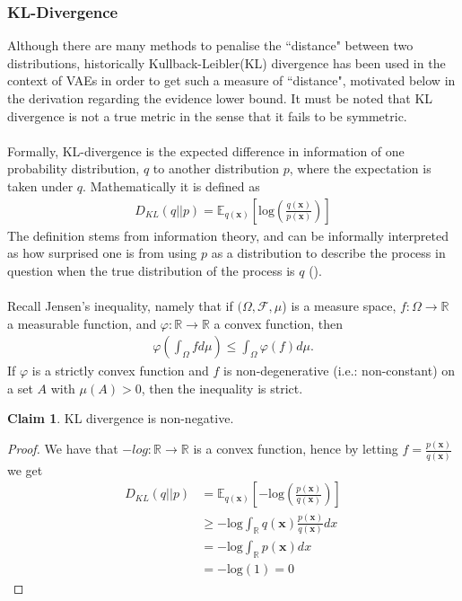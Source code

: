 \documentclass{article}
\theoremstyle{definition}
\newtheorem{claim}{Claim}
\begin{document}
\subsubsection{KL-Divergence}
Although there are many methods to penalise the ``distance" between two distributions, historically Kullback-Leibler(KL) divergence has been used in the context of VAEs in order to get such a measure of ``distance", motivated below in the derivation regarding the evidence lower bound. It must be noted that KL divergence is not a true metric in the sense that it fails to be symmetric.\\\\
Formally, KL-divergence is the expected difference in information of one probability distribution, $q$ to another distribution $p$, where the expectation is taken under $q$. Mathematically it is defined as
\begin{align}
D_{KL}(q||p) =\mathbb{E}_{q(\mathbf{x})}\left[\text{log}\left(\frac{q(\mathbf{x})}{p(\mathbf{x})}\right)\right]
\end{align}
The definition stems from information theory, and can be informally interpreted as how surprised one is from using $p$ as a distribution to describe the process in question when the true distribution of the process is $q$ (\cite{KLWikipedia2024}).
\\\\
Recall Jensen's inequality, namely that if $(\Omega, \mathcal{F}, \mu$) is a measure space, $f:\Omega \rightarrow \mathbb{R}$ a measurable function, and $\varphi: \mathbb{R} \rightarrow \mathbb{R}$ a convex function, then
\begin{align}
\varphi \left ( \int_{\Omega} f d\mu\right) \leq \int_{\Omega} \varphi (f) d\mu.
\end{align}
If $\varphi$ is a strictly convex function and $f$ is non-degenerative (i.e.: non-constant) on a set $A$ with $\mu(A)>0$, then the inequality is strict.

\begin{claim}{}
KL divergence is non-negative.
\end{claim}

\begin{proof}
We have that $-log: \mathbb{R} \rightarrow \mathbb{R}$ is a convex function, hence by letting $f = \frac{p(\mathbf{x})}{q(\mathbf{x})}$ we get
\begin{align}
D_{KL}(q||p) &=\mathbb{E}_{q(\mathbf{x})}\left[-\text{log}\left(\frac{p(\mathbf{x})}{q(\mathbf{x})}\right)\right] \\
\label{KLinequality}
&\geq - \text{log} \int_{\mathbb{R}} q(\mathbf{x}) \frac{p(\mathbf{x})}{q(\mathbf{x})} dx \\
& = -\text{log} \int_{\mathbb{R}} p(\mathbf{x}) dx \\
& = - \text{log}(1) = 0
\end{align} 
\end{proof}
\end{document}

